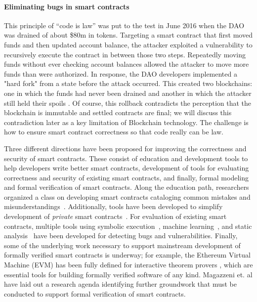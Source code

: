 \paragraph{Eliminating bugs in smart contracts}
This principle of ``code is law'' was put to the test in June 2016 when the DAO was drained of about \$80m in tokens. Targeting a smart contract that first moved funds and then updated account balance, the attacker exploited a vulnerability to recursively execute the contract in between those two steps. Repeatedly moving funds without ever checking account balances allowed the attacker to move more funds than were authorized. In response, the DAO developers implemented a "hard fork" from a state before the attack occurred. This created two blockchains: one in which the funds had never been drained and another in which the attacker still held their spoils \cite{Castillo16}. Of course, this rollback contradicts the perception that the blockchain is immutable and settled contracts are final; we will discuss this contradiction later as a key limitation of Blockchain technology. The challenge is how to ensure smart contract correctness so that code really can be law.

Three different directions have been proposed for improving the correctness and security of smart contracts. These consist of education and development tools to help developers write better smart contracts, development of tools for evaluating correctness and security of existing smart contracts, and finally, formal modeling and formal verification of smart contracts. Along the education path, researchers organized a class on developing smart contracts cataloging common mistakes and misunderstandings~\cite{FC:DAKMS16}. Additionally, tools have been developed to simplify development of \emph{private} smart contracts~\cite{SP:KMSWP16}. For evaluation of existing smart contracts, multiple tools using symbolic execution~\cite{CCS:LCOSH16}, machine learning~\cite{arxiv:Huang18}, and static analysis~\cite{CCS:BDFGGK+16,NDSS:KGDS18} have been developed for detecting bugs and vulnerabilities. Finally, some of the underlying work necessary to support mainstream development of formally verified smart contracts is underway; for example, the Ethereum Virtual Machine (EVM) has been fully defined for interactive theorem provers \cite{Hirai17}, which are essential tools for building formally verified software of any kind. Magazzeni et. al \cite{Magazzeni17} have laid out a research agenda identifying further groundwork that must be conducted to support formal verification of smart contracts.


